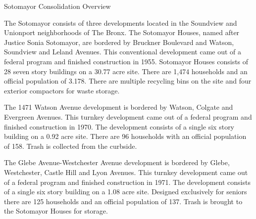 Sotomayor Consolidation Overview

The Sotomayor consists of three developments located in the Soundview and Unionport neighborhoods of The Bronx. The Sotomayor Houses, named after Justice Sonia Sotomayor, are bordered by Bruckner Boulevard and Watson, Soundview and Leland Avenues. This conventional development came out of a federal program and finished construction in 1955. Sotomayor Houses consists of 28 seven story buildings on a 30.77 acre site. There are 1,474 households and an official population of 3.178. There are multiple recycling bins on the site and four exterior compactors for waste storage.

The 1471 Watson Avenue development is bordered by Watson, Colgate and Evergreen Avenues. This turnkey development came out of a federal program and finished construction in 1970. The development consists of a single six story building on a 0.92 acre site. There are 96 households with an official population of 158. Trash is collected from the curbside.

The Glebe Avenue-Westchester Avenue development is bordered by Glebe, Westchester, Castle Hill and Lyon Avenues. This turnkey development came out of a federal program and finished construction in 1971. The development consists of a single six story building on a 1.08 acre site. Designed exclusively for seniors there are 125 households and an official population of 137. Trash is brought to the Sotomayor Houses for storage.